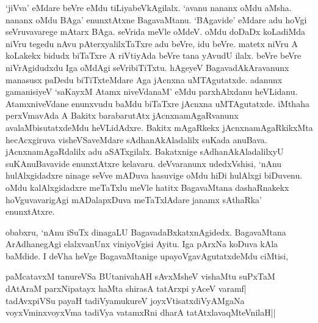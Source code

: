 `jiVva' eMdare beVre eMdu tiLiyabeVkAgilalx. `avanu nananx oMdu aMsha. nananx oMdu BAga' enunxtAtxne BagavaMtanu. `BAgavide' eMdare adu hoVgi seVruvavarege mAtarx BAga. seVrida meVle oMdeV. oMdu doDaDx koLadiMda niVru tegedu nAvu pAterxyalilxTaTxre adu beVre, idu beVre. matetx niVru A koLakekx bidudx biTaTxre A riVtiyAda beVre tana yAvudU ilalx. beVre beVre niVrAgidudxdu Iga oMdAgi seVribiTiTxtu. hAgeyeV BagavadAkAravanunx manasusx paDedu biTiTxteMdare Aga jAcnxna uMTAgutatxde. adanunx gamanisiyeV `saKayxM Atamx niveVdanaM' eMdu parxhAlxdanu heVLidanu. AtamxniveVdane enunxvudu baMdu biTaTxre jAcnxna uMTAgutatxde. iMthaha perxVmavAda A Bakitx barabarutAtx jAcnxnamAgaRvanunx avalaMbisutatxdeMdu heVLidAdxre. Bakitx mAgaRkekx jAcnxnamAgaRkikxMta hecAcxgiruva visheVSaveMdare sAdhanAkAladalilx suKada anuBava. jAcnxnamAgaRdalilx adu aSATxgilalx. Bakatxnige sAdhanAkAladalilxyU suKAnuBavavide enunxtAtxre kelavaru. deVvaranunx udedxVshisi, `nAnu hulAlxgidadxre ninage seVve mADuva hasuvige oMdu hiDi hulAlxgi biDuvenu. oMdu kalAlxgidadxre meTaTxlu meVle hatitx BagavaMtana dashaRnakekx hoVguvavarigAgi mADalapxDuva meTaTxlAdare janamx sAthaRka' enunxtAtxre.

obabxru, `nAnu iSuTx dinagaLU BagavadaBxkatxnAgidedx. BagavaMtana ArAdhanegAgi elalxvanUnx viniyoVgisi Ayitu. Iga pArxNa koDuva kAla baMdide. I deVha heVge BagavaMtanige upayoVgavAgutatxdeMdu ciMtisi,

\begin{shloka}
paMcatavxM tanureVSa BUtanivahAH sAvxMsheV vishaMtu suPxTaM\\
dAtAraM parxNipatayx haMta shirasA tatArxpi yAceV varamf|\\
tadAvxpiVSu payaH tadiVyamukureV joyxVtisatxdiVyAMgaNa\\
voyxVminxvoyxVma tadiVya vatamxRni dharA tatAtxlavaqMteV\s nilaH||
\end{shloka}

